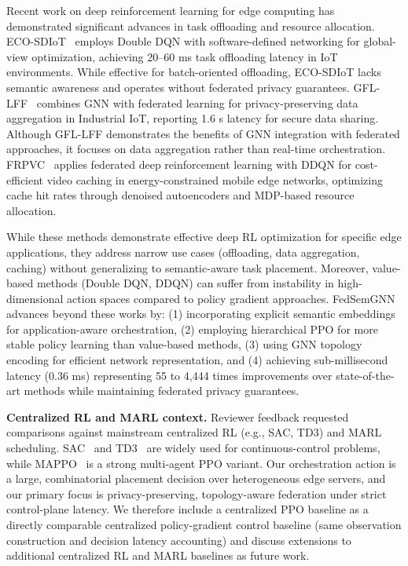 \documentclass[conference]{IEEEtran}
\begin{document}
		Recent work on deep reinforcement learning for edge computing has demonstrated significant advances in task offloading and resource allocation. ECO-SDIoT~\cite{zhu2023eco} employs Double DQN with software-defined networking for global-view optimization, achieving 20--60 ms task offloading latency in IoT environments. While effective for batch-oriented offloading, ECO-SDIoT lacks semantic awareness and operates without federated privacy guarantees. GFL-LFF~\cite{regan2024gfl} combines GNN with federated learning for privacy-preserving data aggregation in Industrial IoT, reporting 1.6 s latency for secure data sharing. Although GFL-LFF demonstrates the benefits of GNN integration with federated approaches, it focuses on data aggregation rather than real-time orchestration. FRPVC~\cite{qian2025frpvc} applies federated deep reinforcement learning with DDQN for cost-efficient video caching in energy-constrained mobile edge networks, optimizing cache hit rates through denoised autoencoders and MDP-based resource allocation.
		
		While these methods demonstrate effective deep RL optimization for specific edge applications, they address narrow use cases (offloading, data aggregation, caching) without generalizing to semantic-aware task placement. Moreover, value-based methods (Double DQN, DDQN) can suffer from instability in high-dimensional action spaces compared to policy gradient approaches. FedSemGNN advances beyond these works by: (1) incorporating explicit semantic embeddings for application-aware orchestration, (2) employing hierarchical PPO for more stable policy learning than value-based methods, (3) using GNN topology encoding for efficient network representation, and (4) achieving sub-millisecond latency (0.36 ms) representing 55 to 4,444 times improvements over state-of-the-art methods while maintaining federated privacy guarantees.
		
		\noindent\textbf{Centralized RL and MARL context.} Reviewer feedback requested comparisons against mainstream centralized RL (e.g., SAC, TD3) and MARL scheduling. SAC~\cite{haarnoja2018sac} and TD3~\cite{fujimoto2018td3} are widely used for continuous-control problems, while MAPPO~\cite{yu2021mappo} is a strong multi-agent PPO variant. Our orchestration action is a large, combinatorial placement decision over heterogeneous edge servers, and our primary focus is privacy-preserving, topology-aware federation under strict control-plane latency. We therefore include a centralized PPO baseline as a directly comparable centralized policy-gradient control baseline (same observation construction and decision latency accounting) and discuss extensions to additional centralized RL and MARL baselines as future work.
		
\end{document}
